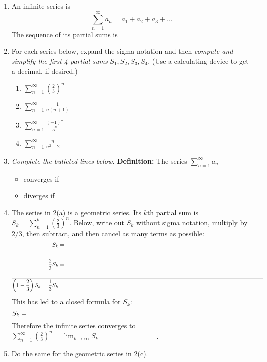 \documentclass[11pt,fleqn]{article}
\newcommand{\ds}{\displaystyle}
\begin{document}
\normalsize
\vspace{-5mm}
\hrulefill
\begin{enumerate}
\item An infinite series is
    $$\sum_{n=1}^\infty a_n = a_1 + a_2 + a_3 + \dots$$
The sequence of its partial sums is

\vspace{1.5in}

\item For each series below, expand the sigma notation and then \emph{compute and simplify the first 4 partial sums} $S_1, S_2, S_3,S_4.$  (Use a calculating device to get a decimal, if desired.) 
	\begin{enumerate}
	\item $\displaystyle \sum_{n=1}^\infty \left( \frac{2}{3} \right)^n$
	\vfill
	\item $\displaystyle \sum_{n=1}^\infty  \frac{1}{n(n+1)} $
	\vfill
	\item $\displaystyle \sum_{n=1}^\infty  \frac{(-1)^n}{5^n}$
	\vfill

\clearpage\newpage
	\item $\displaystyle \sum_{n=1}^\infty  \frac{n}{n^2+2}$
	\vfill
	\end{enumerate}

\item \emph{Complete the bulleted lines below.} \quad \textbf{Definition:} The series $\ds \sum_{n=1}^\infty a_n$ \\
\begin{itemize}
	\item converges if \\
	
	\item diverges if \\
	
\end{itemize}

\item The series in 2(a) is a geometric series.  Its $k$th partial sum is $\ds S_k = \sum_{n=1}^k \left(\frac{2}{3}\right)^n$.  Below, write out $S_k$ without sigma notation, multiply by $2/3$, then subtract, and then cancel as many terms as possible:
\begin{align*}
S_k &= \hspace{5.0in} \\ \\
\frac{2}{3} S_k &= \\ \\ \hline
\left(1 - \frac{2}{3}\right) S_k = \frac{1}{3} S_k &=
\end{align*}
This has led to a closed formula for $S_k$:
	$$S_k = \hspace{5.0in}$$
Therefore the infinite series converges to \quad $\ds \sum_{n=1}^\infty \left(\frac{2}{3}\right)^n = \lim_{k\to\infty} S_k = \boxed{\phantom{\int fosd asdf sdfa}}$.

\item Do the same for the geometric series in 2(c).

\vspace{1.7in}
\end{enumerate}
\end{document}
